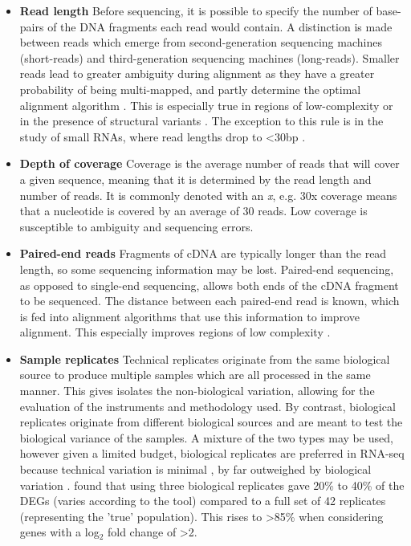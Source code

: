 \begin{itemize}

\item[] \textbf{Read length} \hspace{0.15cm} Before sequencing, it is possible to specify the number of base-pairs of the DNA fragments each read would contain. A distinction is made between reads which emerge from second-generation sequencing machines (short-reads) and third-generation sequencing machines (long-reads). Smaller reads lead to greater ambiguity during alignment as they have a greater probability of being multi-mapped, and partly determine the optimal alignment algorithm \citep{albert2020biostar}. This is especially true in regions of low-complexity or in the presence of structural variants \citep{rhoads2015pacbio}. The exception to this rule is in the study of small RNAs, where read lengths drop to <30bp \citep{albert2020biostar}.

\item[] \textbf{Depth of coverage} \hspace{0.15cm} Coverage is the average number of reads that will cover a given sequence, meaning that it is determined by the read length and number of reads. It is commonly denoted with an \textit{x}, e.g. 30x coverage means that a nucleotide is covered by an average of 30 reads. Low coverage is susceptible to ambiguity and sequencing errors.

\item[] \textbf{Paired-end reads} \hspace{0.15cm} Fragments of cDNA are typically longer than the read length, so some sequencing information may be lost. Paired-end sequencing, as opposed to single-end sequencing, allows both ends of the cDNA fragment to be sequenced. The distance between each paired-end read is known, which is fed into alignment algorithms that use this information to improve alignment. This especially improves regions of low complexity \citep{albert2020biostar}.

\item[] \textbf{Sample replicates} \hspace{0.15cm} Technical replicates originate from the same biological source to produce multiple samples which are all processed in the same manner. This gives isolates the non-biological variation, allowing for the evaluation of the instruments and methodology used. By contrast, biological replicates originate from different biological sources and are meant to test the biological variance of the samples. A mixture of the two types may be used, however given a limited budget, biological replicates are preferred in RNA-seq because technical variation is minimal \citep{bullard2010evaluation}, by far outweighed by biological variation \citep{liu2014rna}. \cite{schurch2016many} found that using three biological replicates gave 20\% to 40\% of the \ac{DEG}s (varies according to the tool) compared to a full set of 42 replicates (representing the 'true' population). This rises to >85\% when considering genes with a log$_2$ fold change of >2.
\end{itemize}


